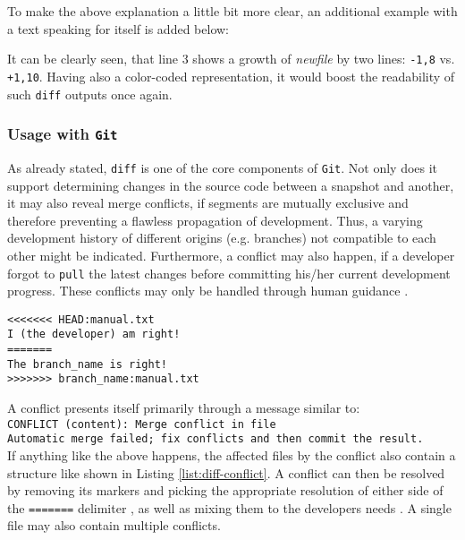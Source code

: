 To make the above explanation a little bit more clear, an additional example with a text speaking for itself is added below:



It can be clearly seen, that line 3 shows a growth of \emph{newfile} by two lines: \texttt{-1,8} vs. \texttt{+1,10}. Having also a color-coded representation, it would boost the readability of such \texttt{diff} outputs once again.


\subsubsection{Usage with \texttt{Git}}
As already stated, \texttt{diff} is one of the core components of \texttt{Git}. Not only does it support determining changes in the source code between a snapshot and another, it may also reveal merge conflicts, if segments are mutually exclusive and therefore preventing a flawless propagation of development. Thus, a varying development history of different origins (e.g. branches) not compatible to each other might be indicated. Furthermore, a conflict may also happen, if a developer forgot to \texttt{pull} the latest changes before committing his/her current development progress. These conflicts may only be handled through human guidance \cite[124]{loeliger2012version}.

\begin{lstlisting}[label={list:diff-conflict}, caption={A snippet of a file called ``manual.txt'', which is affected by a conflict. Content between \texttt{HEAD} and \texttt{=======} contains the local version, content below contains the foreign conflicting version.}]
<<<<<<< HEAD:manual.txt
I (the developer) am right!
=======
The branch_name is right!
>>>>>>> branch_name:manual.txt
\end{lstlisting}

A conflict presents itself primarily through a message similar to:\\
\texttt{CONFLICT (content): Merge conflict in file\\
Automatic merge failed; fix conflicts and then commit the result.}\\
If anything like the above happens, the affected files by the conflict also contain a structure like shown in Listing \ref{list:diff-conflict}. A conflict can then be resolved by removing its markers and picking the appropriate resolution of either side of the \texttt{=======} delimiter \cite{GitConflicts}, as well as mixing them to the developers needs \cite[126]{loeliger2012version}. A single file may also contain multiple conflicts.


